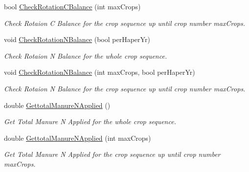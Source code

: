 \begin{DoxyCompactItemize}
bool \mbox{\hyperlink{class_crop_sequence_class_a5099fe7283418a6962e9ae4d69200543}{Check\+Rotation\+C\+Balance}} (int max\+Crops)
\begin{DoxyCompactList}\small\item\em Check Rotaion C Balance for the crop sequence up until crop number max\+Crops. \end{DoxyCompactList}\item 
\mbox{\label{class_crop_sequence_class_a493356e22d3b83da02f2df0ff571c6ab}} 
void \mbox{\hyperlink{class_crop_sequence_class_a493356e22d3b83da02f2df0ff571c6ab}{Check\+Rotation\+N\+Balance}} (bool per\+Haper\+Yr)
\begin{DoxyCompactList}\small\item\em Check Rotaion N Balance for the whole crop sequence. \end{DoxyCompactList}\item 
void \mbox{\hyperlink{class_crop_sequence_class_aa078d5e9470d8f731d42275788fdf3d4}{Check\+Rotation\+N\+Balance}} (int max\+Crops, bool per\+Haper\+Yr)
\begin{DoxyCompactList}\small\item\em Check Rotaion N Balance for the crop sequence up until crop number max\+Crops. \end{DoxyCompactList}\item 
\mbox{\label{class_crop_sequence_class_a01abdbc3d224f97bd267ce249dabb2c6}} 
double \mbox{\hyperlink{class_crop_sequence_class_a01abdbc3d224f97bd267ce249dabb2c6}{Gettotal\+Manure\+N\+Applied}} ()
\begin{DoxyCompactList}\small\item\em Get Total Manure N Applied for the whole crop sequence. \end{DoxyCompactList}\item 
\mbox{\label{class_crop_sequence_class_a60c079f8e1a758f2bd4f6124dd7acfcc}} 
double \mbox{\hyperlink{class_crop_sequence_class_a60c079f8e1a758f2bd4f6124dd7acfcc}{Gettotal\+Manure\+N\+Applied}} (int max\+Crops)
\begin{DoxyCompactList}\small\item\em Get Total Manure N Applied for the crop sequence up until crop number max\+Crops. \end{DoxyCompactList}\item 
\mbox{\label{class_crop_sequence_class_a6796771f354e44de318c5801a1842285}} 

\end{DoxyCompactItemize}

